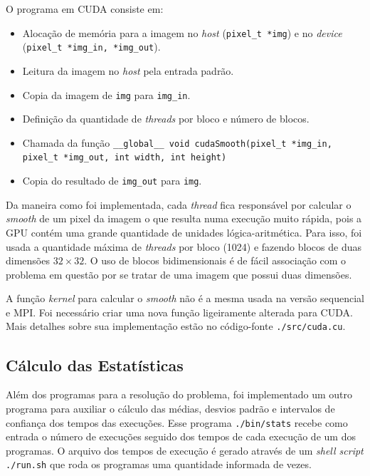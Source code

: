 O programa em CUDA consiste em:
\begin{itemize}
	\item Alocação de memória para a imagem no \textit{host} (\texttt{pixel\_t *img}) e no \textit{device} (\texttt{pixel\_t *img\_in, *img\_out}).
	
	\item Leitura da imagem no \textit{host} pela entrada padrão.
	
	\item Copia da imagem de \texttt{img} para \texttt{img\_in}.
	
	\item Definição da quantidade de \textit{threads} por bloco e número de blocos.
	
	\item Chamada da função \texttt{\_\_global\_\_ void cudaSmooth(pixel\_t *img\_in, pixel\_t *img\_out, int width, int height)}
	
	\item Copia do resultado de \texttt{img\_out} para \texttt{img}.
\end{itemize}

Da maneira como foi implementada, cada \textit{thread} fica responsável por calcular o \textit{smooth} de um pixel da imagem o que resulta numa execução muito rápida, pois a GPU contém uma grande quantidade de unidades lógica-aritmética. Para isso, foi usada a quantidade máxima de \textit{threads} por bloco (1024) e fazendo blocos de duas dimensões $32 \times 32$. O uso de blocos bidimensionais é de fácil associação com o problema em questão por se tratar de uma imagem que possui duas dimensões.

A função \textit{kernel} para calcular o \textit{smooth} não é a mesma usada na versão sequencial e MPI. Foi necessário criar uma nova função ligeiramente alterada para CUDA. Mais detalhes sobre sua implementação estão no código-fonte \texttt{./src/cuda.cu}.

\subsection{Cálculo das Estatísticas}

Além dos programas para a resolução do problema, foi implementado um outro programa para auxiliar o cálculo das médias, desvios padrão e intervalos de confiança dos tempos das execuções. Esse programa \texttt{./bin/stats} recebe como entrada o número de execuções seguido dos tempos de cada execução de um dos programas. O arquivo dos tempos de execução é gerado através de um \textit{shell script} \texttt{./run.sh} que roda os programas uma quantidade informada de vezes.

